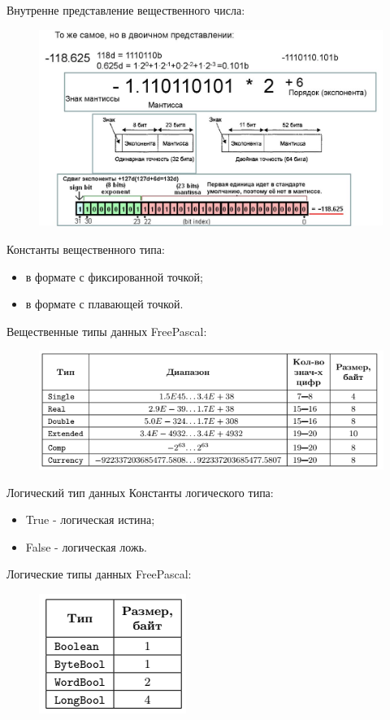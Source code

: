 \documentclass{beamer}
\begin{document}
\begin{frame}
Внутренне представление вещественного числа:
\begin{figure}[h]
\centering
\includegraphics[scale=0.7]{images/lec02-pic09.png}
\end{figure}
\end{frame} 

\begin{frame}
Константы вещественного типа:
\begin{itemize}
\item в формате с фиксированной точкой;
\item в формате с плавающей точкой.
\end{itemize}
Вещественные типы данных FreePascal:
\begin{figure}[h]
\centering
\includegraphics[scale=0.7]{images/lec02-pic08.png}
\end{figure}
\end{frame} 

\begin{frame}{Логический тип данных}
Константы логического типа:
\begin{itemize}
\item True - логическая истина;
\item False - логическая ложь.
\end{itemize}
Логические типы данных FreePascal:
\begin{figure}[h]
\centering
\includegraphics[scale=0.75]{images/lec02-pic10.png}
\end{figure}
\end{frame} 
\end{document}
